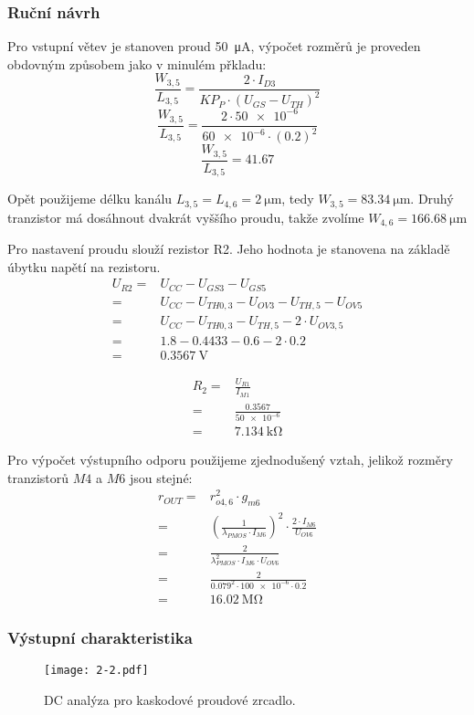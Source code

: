 \subsubsection{Ruční návrh}
Pro vstupní větev je stanoven proud \qty{50}{\micro\ampere}, výpočet rozměrů je proveden obdovným způsobem jako v minulém přkladu:
\[
    \frac{W_{3,5}}{L_{3,5}}=\frac{2\cdot I_{D3}}{KP_{P}\cdot (U_{GS} -U_{TH})^2 } 
\]
\[
    \frac{W_{3,5}}{L_{3,5}}=\frac{2\cdot \num{50e-6}}{\num{60e-6} \cdot (\num{0.2})^2 } 
\]
\[
    \frac{W_{3,5}}{L_{3,5}}=\num{41,67}
\]

Opět použijeme délku kanálu \(L_{3,5}=L_{4,6} = \qty{2}{\micro\meter}\), tedy \(W_{3,5} =\qty[round-mode=places,round-precision=2]{83,34}{\micro\meter}\). Druhý tranzistor má dosáhnout dvakrát vyššího proudu, takže zvolíme \(W_{4,6} =\qty{166,68}{\micro\meter}\)  

Pro nastavení proudu slouží rezistor R2. Jeho hodnota je stanovena na základě úbytku napětí na rezistoru.
\begin{align*}
    U_{R 2}=&U_{C C}-U_{G S 3}-U_{G S 5} \\
           =&U_{C C}-U_{T H 0,3}- U_{O V 3}-U_{T H, 5}-U_{O V 5} \\
           =&U_{C C}-U_{T H 0,3}-U_{T H, 5}-2 \cdot U_{O V 3,5} \\
           =&\num{1.8}-\num{0.4433}-\num{0.6}-2 \cdot \num{0.2} \\
           =&\qty{0.3567}{\volt}
\end{align*}

\begin{align*}
    R_{2} =& \frac{U_{R1}}{I_{M1} } \\
          =& \frac{\num{0.3567}}{\num{50e-6}} \\
          =& \qty{7.134}{\kilo\ohm}
\end{align*}

Pro výpočet výstupního odporu použijeme zjednodušený vztah, jelikož rozměry tranzistorů \(M4\) a \(M6\) jsou stejné:
\begin{align*}
    r_{OUT} =& r_{o4,6}^2 \cdot g_{m6} \\
            =& \left(\frac{1}{\lambda_{PMOS} \cdot I_{M6} }\right)^2 \cdot \frac{2\cdot I_{M6}}{U_{OV6} } \\
            =& \frac{2}{\lambda_{PMOS}^2 \cdot I_{M6} \cdot U_{OV6} } \\
            =& \frac{2}{\num{0.079}^2 \cdot \num{100e-6} \cdot \num{0.2}} \\
            =& \qty{16.02}{\mega\ohm}
\end{align*}

\subsubsection{Výstupní charakteristika}
\begin{figure}[h!]
    \centering
    \texttt{[image: 2-2.pdf]}
    \caption{DC analýza pro kaskodové proudové zrcadlo.}
    \label{fig:2-2-pdf}
\end{figure}
